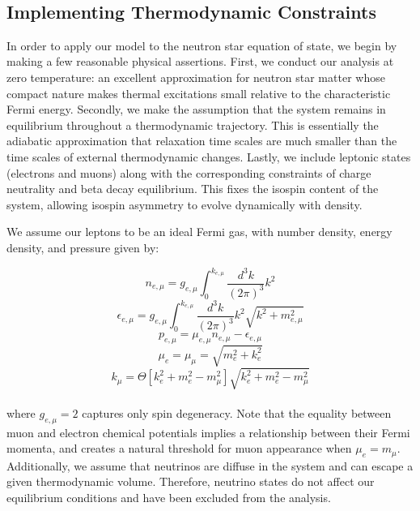 \documentclass[twocolumn,floatfix,superscriptaddress,a4paper,showkeys,nofootinbib,reprint]{revtex4-1}
\begin{document}
~
~
\subsection{Implementing Thermodynamic Constraints}
\label{subsec:minimization}

In order to apply our model to the neutron star equation of state, we begin by making a few reasonable physical assertions. First, we conduct our analysis at zero temperature: an excellent approximation for neutron star matter whose compact nature makes thermal excitations small relative to the characteristic Fermi energy. Secondly, we make the assumption that the system remains in equilibrium throughout a thermodynamic trajectory. This is essentially the adiabatic approximation that relaxation time scales are much smaller than the time scales of external thermodynamic changes. Lastly, we include leptonic states (electrons and muons) along with the corresponding constraints of charge neutrality and beta decay equilibrium. This fixes the isospin content of the system, allowing isospin asymmetry to evolve dynamically with density.

We assume our leptons to be an ideal Fermi gas, with number density, energy density, and pressure given by:

\begin{equation}
    n_{e,\mu} = g_{e,\mu}
\int_{0}^{k_{e,\mu}}
\frac{d^3 k}{(2\pi)^3}
k^2
\end{equation}
\begin{equation}
    \epsilon_{e,\mu} = g_{e,\mu}
\int_{0}^{k_{e,\mu}}
\frac{d^3 k}{(2\pi)^3}
k^2\sqrt{k^2+m_{e,\mu}^2}
\end{equation}
\begin{equation}
    p_{e,\mu} = 
    \mu_{e,\mu}n_{e,\mu} - \epsilon_{e,\mu}
\end{equation}
\begin{equation}
    \mu_e = \mu_\mu = \sqrt{m_e^2 + k_e^2}
\end{equation}
\begin{equation}    k_{\mu}=\Theta\left[k_e^2+m_e^2-m_\mu^2\right]\sqrt{k_e^2+m_e^2-m_\mu^2}
\end{equation}
\\
where $g_{e,\mu}=2$ captures only spin degeneracy. Note that the equality between muon and electron chemical potentials implies a relationship between their Fermi momenta, and creates a natural threshold for muon appearance when $\mu_e = m_\mu$. Additionally, we assume that neutrinos are diffuse in the system and can escape a given thermodynamic volume. Therefore, neutrino states do not affect our equilibrium conditions and have been excluded from the analysis.
\end{document}
